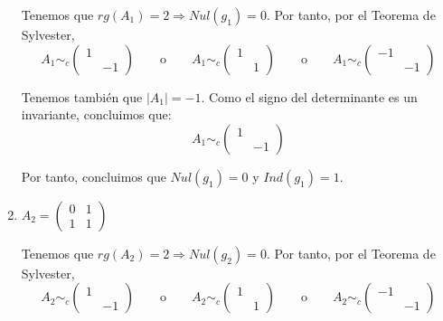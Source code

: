 \begin{ejercicio}
\begin{enumerate}
        Tenemos que $rg(A_1) = 2 \Longrightarrow Nul(g_1)=0$. Por tanto, por el Teorema de Sylvester,
        \begin{equation*}
            A_1 \sim_c \left(\begin{array}{cc}
                1 &  \\
                & -1
            \end{array} \right)
            \qquad \text{o} \qquad
            A_1 \sim_c \left(\begin{array}{cc}
                1 &  \\
                & 1
            \end{array} \right)
            \qquad \text{o} \qquad
            A_1 \sim_c \left(\begin{array}{cc}
                -1 &  \\
                & -1
            \end{array} \right)
        \end{equation*}

        Tenemos también que $|A_1| = -1$. Como el signo del determinante es un invariante, concluimos que:
        \begin{equation*}
            A_1 \sim_c \left(\begin{array}{cc}
                1 &  \\
                & -1
            \end{array} \right)
        \end{equation*}
        
        Por tanto, concluimos que $Nul(g_1)=0$ y $Ind(g_1)=1$.

        \item $A_2=\left(\begin{array}{cc}
            0 & 1 \\
            1 & 1
        \end{array} \right)$
        
        Tenemos que $rg(A_2) = 2 \Longrightarrow Nul(g_2)=0$. Por tanto, por el Teorema de Sylvester,
        \begin{equation*}
            A_2 \sim_c \left(\begin{array}{cc}
                1 &  \\
                & -1
            \end{array} \right)
            \qquad \text{o} \qquad
            A_2 \sim_c \left(\begin{array}{cc}
                1 &  \\
                & 1
            \end{array} \right)
            \qquad \text{o} \qquad
            A_2 \sim_c \left(\begin{array}{cc}
                -1 &  \\
                & -1
            \end{array} \right)
        \end{equation*}


\end{enumerate}
\end{ejercicio}
